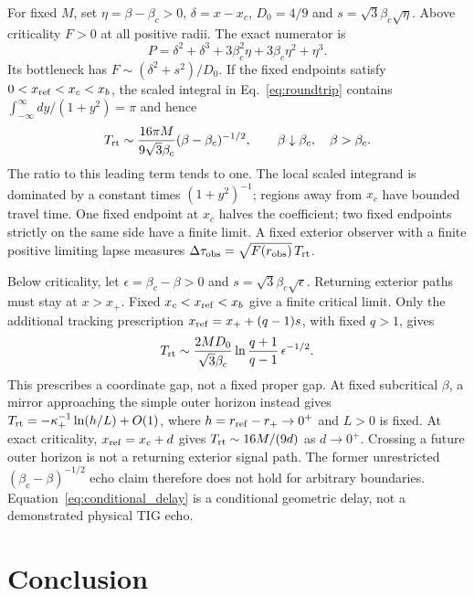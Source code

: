 \documentclass[11pt,final]{article}
\begin{document}
For fixed $M$, set $\eta=\beta-\beta_c>0$, $\delta=x-x_c$,
$D_0=4/9$ and $s=\sqrt3\beta_c\sqrt{\eta}$. Above criticality $F>0$ at
all positive radii. The exact numerator is
\begin{equation}
P=\delta^2+\delta^3+3\beta_c^2\eta+3\beta_c\eta^2+\eta^3.
\end{equation}
Its bottleneck has $F\sim(\delta^2+s^2)/D_0$. If the fixed endpoints
satisfy $0<x_{\rm ref}<x_c<x_b$, the scaled integral in
Eq.~\eqref{eq:roundtrip} contains
$\int_{-\infty}^{\infty}dy/(1+y^2)=\pi$ and hence
\begin{equation}
T_{\rm rt}\sim\frac{16\pi M}{9\sqrt3\beta_c}
(\beta-\beta_c)^{-1/2},\qquad \beta\downarrow\beta_c,\quad\beta>\beta_c.
\label{eq:conditional_delay}
\end{equation}
The ratio to this leading term tends to one. The local scaled integrand is
dominated by a constant times $(1+y^2)^{-1}$; regions away from $x_c$
have bounded travel time. One fixed endpoint at $x_c$ halves the coefficient;
two fixed endpoints strictly on the same side have a finite limit.
A fixed exterior observer with a finite positive limiting lapse measures
$\Delta\tau_{\rm obs}=\sqrt{F(r_{\rm obs})}\,T_{\rm rt}$.

Below criticality, let $\epsilon=\beta_c-\beta>0$ and
$s=\sqrt3\beta_c\sqrt{\epsilon}$. Returning exterior paths must stay at
$x>x_+$. Fixed $x_c<x_{\rm ref}<x_b$ give a finite critical limit.
Only the additional tracking prescription
$x_{\rm ref}=x_++(q-1)s$, with fixed $q>1$, gives
\begin{equation}
T_{\rm rt}\sim\frac{2MD_0}{\sqrt3\beta_c}
\ln\frac{q+1}{q-1}\,\epsilon^{-1/2}.
\end{equation}
This prescribes a coordinate gap, not a fixed proper gap.
At fixed subcritical $\beta$, a mirror approaching the simple outer horizon
instead gives $T_{\rm rt}=-\kappa_+^{-1}\ln(h/L)+O(1)$, where
$h=r_{\rm ref}-r_+\to0^+$ and $L>0$ is fixed.
At exact criticality, $x_{\rm ref}=x_c+d$ gives
$T_{\rm rt}\sim16M/(9d)$ as $d\to0^+$.
Crossing a future outer horizon is not a returning exterior signal path.
The former unrestricted $(\beta_c-\beta)^{-1/2}$ echo claim therefore does
not hold for arbitrary boundaries. Equation~\eqref{eq:conditional_delay}
is a conditional geometric delay, not a demonstrated physical TIG echo.

\section{Conclusion}
\end{document}
